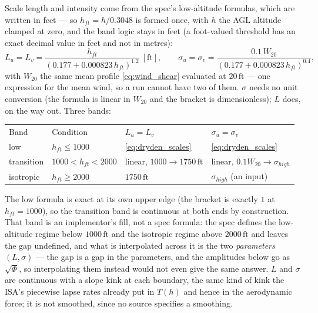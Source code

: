 Scale length and intensity come from the spec's low-altitude formulas, which are written in feet
--- so $h_{ft}=h/0.3048$ is formed once, with $h$ the AGL altitude clamped at zero, and the band
logic stays in feet (a foot-valued threshold has an exact decimal value in feet and not in metres):
\begin{equation} \label{eq:dryden_scales}
    L_u = L_v = \frac{h_{ft}}{\left(0.177+0.000823\,h_{ft}\right)^{1.2}}\ \mathrm{[ft]}, \qquad
    \sigma_u = \sigma_v = \frac{0.1\,W_{20}}{\left(0.177+0.000823\,h_{ft}\right)^{0.4}},
\end{equation}
with $W_{20}$ the same mean profile \autoref{eq:wind_shear} evaluated at $20\,\mathrm{ft}$ --- one
expression for the mean wind, so a run cannot have two of them. $\sigma$ needs no unit conversion
(the formula is linear in $W_{20}$ and the bracket is dimensionless); $L$ does, on the way out.
Three bands:
\begin{center}
\begin{tabular}{l l l l}
Band & Condition & $L_u=L_v$ & $\sigma_u=\sigma_v$ \\
low        & $h_{ft}\leq1000$      & \autoref{eq:dryden_scales} & \autoref{eq:dryden_scales} \\
transition & $1000<h_{ft}<2000$    & linear, $1000\to1750\,\mathrm{ft}$ & linear, $0.1W_{20}\to\sigma_{high}$ \\
isotropic  & $h_{ft}\geq2000$      & $1750\,\mathrm{ft}$ & $\sigma_{high}$ (an input) \\
\end{tabular}
\end{center}
The low formula is exact at its own upper edge (the bracket is exactly $1$ at
$h_{ft}=1000$), so the transition band is continuous at both ends by construction. That band is an
implementor's fill, not a spec formula: the spec defines the low-altitude regime below
$1000\,\mathrm{ft}$ and the isotropic regime above $2000\,\mathrm{ft}$ and leaves the gap
undefined, and what is interpolated across it is the two \emph{parameters} $(L,\sigma)$ --- the gap
is a gap in the parameters, and the amplitudes below go as $\sqrt{\Phi}$, so interpolating them
instead would not even give the same answer. $L$ and $\sigma$ are continuous with a slope kink at
each boundary, the same kind of kink the ISA's piecewise lapse rates already put in $T(h)$ and
hence in the aerodynamic force; it is not smoothed, since no source specifies a smoothing.

